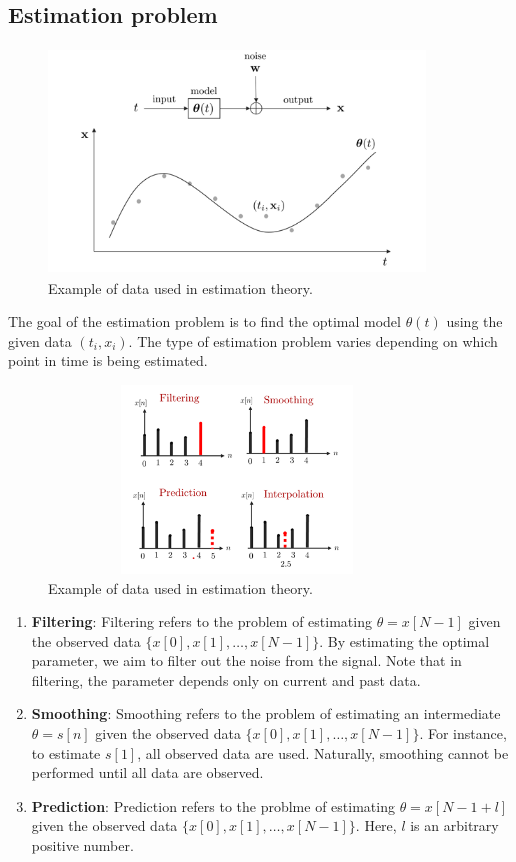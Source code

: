 \documentclass[12pt,a4paper]{article}
\begin{document}
\subsection{Estimation problem}

\begin{figure}[H] %
    \centering
    \includegraphics[height=6cm,width=10cm]{image2.png}
    \caption{Example of data used in estimation theory.}
\end{figure}

The goal of the estimation problem is to find the optimal model \(\theta(t)\) using the given data \((t_{i}, x_{i})\). The type of estimation problem varies depending on which point in time is being estimated.

\begin{figure}[H] %
    \centering
    \includegraphics[height=5cm,width=10cm]{image3.png}
    \caption{Example of data used in estimation theory.}
\end{figure}

\begin{enumerate}
    \item \textbf{Filtering}: Filtering refers to the problem of estimating \(\theta = x[N - 1]\) given the observed data \(\{x[0], x[1], \dots, x[N - 1]\}\). By estimating the optimal parameter, we aim to filter out the noise from the signal. Note that in filtering, the parameter depends only on current and past data.

    \item \textbf{Smoothing}: Smoothing refers to the problem of estimating an intermediate \(\theta = s[n]\) given the observed data \(\{x[0], x[1], \dots, x[N - 1]\}\). For instance, to estimate \(s[1]\), all observed data are used. Naturally, smoothing cannot be performed until all data are observed.
    \item \textbf{Prediction}: Prediction refers to the problme of estimating \(\theta  = x[N - 1 + l]\) given the
          observed data \(\{x[0], x[1], \dots, x[N - 1]\}\). Here, \(l\) is an arbitrary positive number.

\end{enumerate}
\end{document}
